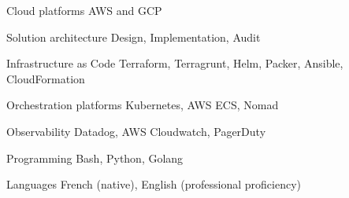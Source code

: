 

\begin{cvskills}

  \cvskill
    {Cloud platforms} %
    {AWS and GCP} %

  \cvskill
    {Solution architecture} %
    {Design, Implementation, Audit} %

  \cvskill
    {Infrastructure as Code} %
    {Terraform, Terragrunt, Helm, Packer, Ansible, CloudFormation} %

  \cvskill
    {Orchestration platforms} %
    {Kubernetes, AWS ECS, Nomad} %

  \cvskill
    {Observability} %
    {Datadog, AWS Cloudwatch, PagerDuty} %

  \cvskill
    {Programming} %
    {Bash, Python, Golang} %

  \cvskill
    {Languages} %
        {French (native), English (professional proficiency)} %

\end{cvskills}
